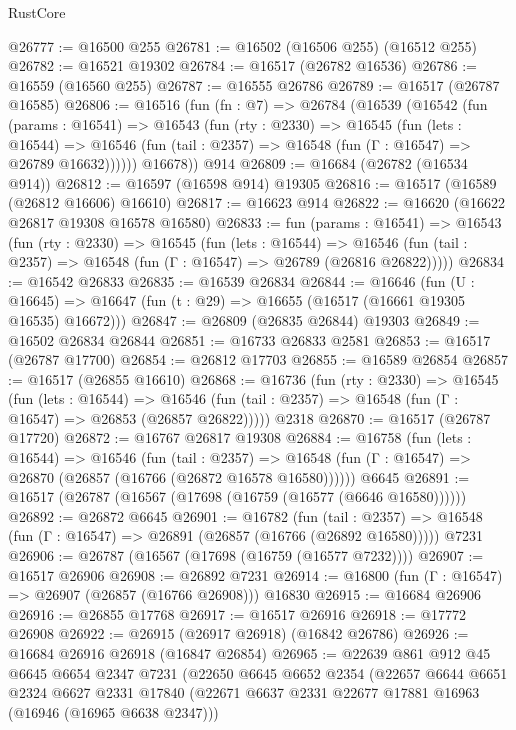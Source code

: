 \begin{lexlean}{RustCore}
\begin{coremodule}
@26777 := @16500 @255
@26781 := @16502 (@16506 @255) (@16512 @255)
@26782 := @16521 @19302
@26784 := @16517 (@26782 @16536)
@26786 := @16559 (@16560 @255)
@26787 := @16555 @26786
@26789 := @16517 (@26787 @16585)
@26806 := @16516
    (fun (fn : @7) =>
    @26784
      (@16539
        (@16542
          (fun (params : @16541) =>
          @16543
            (fun (rty : @2330) =>
            @16545
              (fun (lets : @16544) =>
              @16546 (fun (tail : @2357) => @16548 (fun (Γ : @16547) => @26789 @16632))))))
        @16678))
    @914
@26809 := @16684 (@26782 (@16534 @914))
@26812 := @16597 (@16598 @914) @19305
@26816 := @16517 (@16589 (@26812 @16606) @16610)
@26817 := @16623 @914
@26822 := @16620 (@16622 @26817 @19308 @16578 @16580)
@26833 := fun (params : @16541) =>
  @16543
    (fun (rty : @2330) =>
    @16545
      (fun (lets : @16544) =>
      @16546 (fun (tail : @2357) => @16548 (fun (Γ : @16547) => @26789 (@26816 @26822)))))
@26834 := @16542 @26833
@26835 := @16539 @26834
@26844 := @16646
    (fun (U : @16645) => @16647 (fun (t : @29) => @16655 (@16517 (@16661 @19305 @16535) @16672)))
@26847 := @26809 (@26835 @26844) @19303
@26849 := @16502 @26834 @26844
@26851 := @16733 @26833 @2581
@26853 := @16517 (@26787 @17700)
@26854 := @26812 @17703
@26855 := @16589 @26854
@26857 := @16517 (@26855 @16610)
@26868 := @16736
    (fun (rty : @2330) =>
    @16545
      (fun (lets : @16544) =>
      @16546 (fun (tail : @2357) => @16548 (fun (Γ : @16547) => @26853 (@26857 @26822)))))
    @2318
@26870 := @16517 (@26787 @17720)
@26872 := @16767 @26817 @19308
@26884 := @16758
    (fun (lets : @16544) =>
    @16546
      (fun (tail : @2357) =>
      @16548 (fun (Γ : @16547) => @26870 (@26857 (@16766 (@26872 @16578 @16580))))))
    @6645
@26891 := @16517 (@26787 (@16567 (@17698 (@16759 (@16577 (@6646 @16580))))))
@26892 := @26872 @6645
@26901 := @16782
    (fun (tail : @2357) => @16548 (fun (Γ : @16547) => @26891 (@26857 (@16766 (@26892 @16580)))))
    @7231
@26906 := @26787 (@16567 (@17698 (@16759 (@16577 @7232))))
@26907 := @16517 @26906
@26908 := @26892 @7231
@26914 := @16800 (fun (Γ : @16547) => @26907 (@26857 (@16766 @26908))) @16830
@26915 := @16684 @26906
@26916 := @26855 @17768
@26917 := @16517 @26916
@26918 := @17772 @26908
@26922 := @26915 (@26917 @26918) (@16842 @26786)
@26926 := @16684 @26916 @26918 (@16847 @26854)
@26965 := @22639
    @861
    @912
    @45
    @6645
    @6654
    @2347
    @7231
    (@22650
      @6645
      @6652
      @2354
      (@22657
        @6644
        @6651
        @2324
        @6627
        @2331
        @17840
        (@22671 @6637 @2331 @22677 @17881 @16963 (@16946 (@16965 @6638 @2347)))

\end{coremodule}
\end{lexlean}
